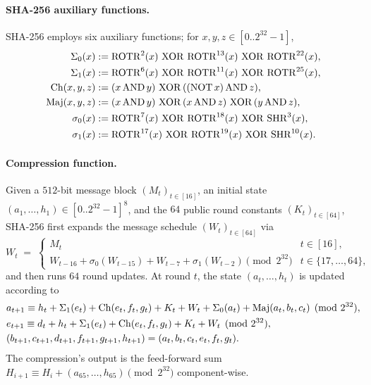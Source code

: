 \paragraph{SHA-256 auxiliary functions.}
SHA-256 employs six auxiliary functions; for $x,y,z \in [0\mathbin{..}2^{32}-1]$,
\begin{align*}
\Sigma_0(x) &:= \operatorname{ROTR}^{2}(x)\, \operatorname{XOR}\, \operatorname{ROTR}^{13}(x)\, \operatorname{XOR}\, \operatorname{ROTR}^{22}(x), \\
\Sigma_1(x) &:= \operatorname{ROTR}^{6}(x)\, \operatorname{XOR}\, \operatorname{ROTR}^{11}(x)\, \operatorname{XOR}\, \operatorname{ROTR}^{25}(x), \\
\operatorname{Ch}(x,y,z) &:= (x \operatorname{AND} y)\, \operatorname{XOR}\, ((\operatorname{NOT} x) \operatorname{AND} z), \\
\operatorname{Maj}(x,y,z) &:= (x \operatorname{AND} y)\, \operatorname{XOR}\, (x \operatorname{AND} z)\, \operatorname{XOR}\, (y \operatorname{AND} z), \\
\sigma_0(x) &:= \operatorname{ROTR}^{7}(x)\, \operatorname{XOR}\, \operatorname{ROTR}^{18}(x)\, \operatorname{XOR}\, \operatorname{SHR}^{3}(x), \\
\sigma_1(x) &:= \operatorname{ROTR}^{17}(x)\, \operatorname{XOR}\, \operatorname{ROTR}^{19}(x)\, \operatorname{XOR}\, \operatorname{SHR}^{10}(x).
\end{align*}

\paragraph{Compression function.}
Given a $512$-bit message block $(M_t)_{t \in [16]}$, an initial state
$(a_1,\dots,h_1) \in [0\mathbin{..}2^{32}-1]^8$, and the
$64$ public round constants $(K_t)_{t\in[64]}$, SHA-256 first expands
the message schedule $(W_t)_{t\in[64]}$ via
\begin{equation}\label{eq:msched}
W_t \;=\; \begin{cases} M_t & t \in [16], \\
W_{t-16} + \sigma_0(W_{t-15}) + W_{t-7} + \sigma_1(W_{t-2}) \pmod{2^{32}} & t \in \{17,\dots,64\},
\end{cases}
\end{equation}
and then runs $64$ round updates. At round $t$, the state
$(a_t,\dots,h_t)$ is updated according to
\begin{align}
&a_{t+1} \equiv h_t + \Sigma_1(e_t) + \operatorname{Ch}(e_t,f_t,g_t) + K_t + W_t + \Sigma_0(a_t) + \operatorname{Maj}(a_t,b_t,c_t) \pmod{2^{32}}, \label{eq:a-update}\\
&e_{t+1} \equiv d_t + h_t + \Sigma_1(e_t) + \operatorname{Ch}(e_t,f_t,g_t) + K_t + W_t
                \pmod{2^{32}}, \label{eq:e-update}\\
&(b_{t+1},c_{t+1},d_{t+1},f_{t+1},g_{t+1},h_{t+1}) = (a_t,b_t,c_t,e_t,f_t,g_t).\notag
\end{align}
The compression's output is the feed-forward sum
$H_{i+1} \equiv H_i + (a_{65},\dots,h_{65}) \pmod{2^{32}}$ component-wise.

